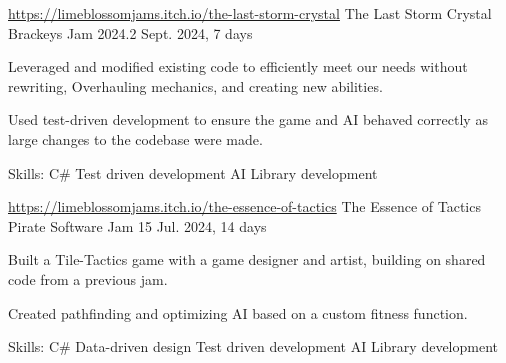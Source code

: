 

\begin{cventries}

 \cventry
  {\href{https://limeblossomjams.itch.io/the-last-storm-crystal}{https://limeblossomjams.itch.io/the-last-storm-crystal}} %
   {The Last Storm Crystal} %
   {Brackeys Jam 2024.2} %
   {Sept. 2024, 7 days} %
   {
     \begin{cvitems} %
      \item {Leveraged and modified existing code to efficiently meet our needs without rewriting, Overhauling mechanics, and creating new abilities.}
      \item {Used test-driven development to ensure the game and AI behaved correctly as large changes to the codebase were made.}
      \item {Skills: C\# \textbullet{} Test driven development \textbullet{} AI \textbullet{} Library development }
     \end{cvitems}
   }
 
  \cventry
   {\href{https://limeblossomjams.itch.io/the-essence-of-tactics}{https://limeblossomjams.itch.io/the-essence-of-tactics}} %
    {The Essence of Tactics} %
    {Pirate Software Jam 15} %
    {Jul. 2024, 14 days} %
    {
      \begin{cvitems} %
        \item {Built a Tile-Tactics game with a game designer and artist, building on shared code from a previous jam.}
        \item {Created pathfinding and optimizing AI based on a custom fitness function.}
        \item {Skills: C\# \textbullet{} Data-driven design \textbullet{} Test driven development \textbullet{} AI \textbullet{} Library development }
      \end{cvitems}
    }


\end{cventries}
